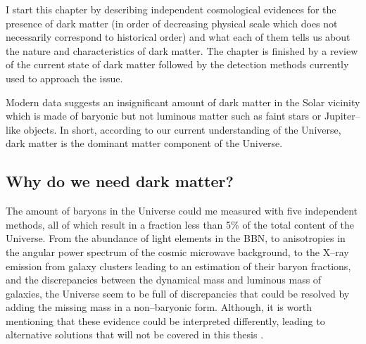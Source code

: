 \documentclass[paper=a4, fontsize=11pt]{scrartcl} %
\numberwithin{equation}{section} %
\numberwithin{figure}{section} %
\numberwithin{table}{section} %
\begin{document}
I start this chapter by describing independent cosmological evidences for the presence of dark matter (in order of decreasing physical scale which does not necessarily correspond to historical order) and what each of them tells us about the nature and characteristics of dark matter. The chapter is finished by a review of the current state of dark matter followed by the detection methods currently used to approach the issue.

Modern data suggests an insignificant amount of dark matter in the Solar vicinity which is made of baryonic but not luminous matter such as faint stars or Jupiter--like objects. In short, according to our current understanding of the Universe, dark matter is the dominant matter component of the Universe.


\subsection{Why do we need dark matter?}

The amount of baryons in the Universe could me measured with five independent methods, all of which result in a fraction less than 5\% of the total content of the Universe. From the abundance of light elements in the BBN, to anisotropies in the angular power spectrum of the cosmic microwave background, to the X--ray emission from galaxy clusters leading to an estimation of their baryon fractions, and the discrepancies between the dynamical mass and luminous mass of galaxies, the Universe seem to be full of discrepancies that could be resolved by adding the missing mass in a non--baryonic form. Although, it is worth mentioning that these evidence could be interpreted differently, leading to alternative solutions that will not be covered in this thesis \citep[but see e.g. ][]{}.

\end{document}
